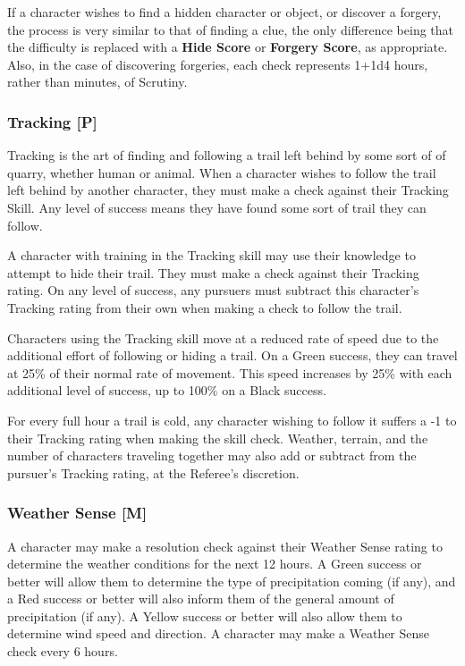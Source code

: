 \documentclass[oneside]{book}
\begin{document}
\begin{multicols}{2}
If a character wishes to find a hidden character or object, or discover a forgery, the process is very similar to that of finding a clue, the only difference being that the difficulty is replaced with a \textbf{Hide Score} or \textbf{Forgery Score}, as appropriate. Also, in the case of discovering forgeries, each check represents 1+1d4 hours, rather than minutes, of Scrutiny. 

\subsubsection{Tracking [P]}
Tracking is the art of finding and following a trail left behind by some sort of of quarry, whether human or animal. When a character wishes to follow the trail left behind by another character, they must make a check against their Tracking Skill. Any level of success means they have found some sort of trail they can follow.

A character with training in the Tracking skill may use their knowledge to attempt to hide their trail. They must make a check against their Tracking rating. On any level of success, any pursuers must subtract this character's Tracking rating from their own when making a check to follow the trail. 

Characters using the Tracking skill move at a reduced rate of speed due to the additional effort of following or hiding a trail. On a Green success, they can travel at 25\% of their normal rate of movement. This speed increases by 25\% with each additional level of success, up to 100\% on a Black success.

For every full hour a trail is cold, any character wishing to follow it suffers a -1 to their Tracking rating when making the skill check. Weather, terrain, and the number of characters traveling together may also add or subtract from the pursuer's Tracking rating, at the Referee's discretion.

\subsubsection{Weather Sense [M]}
A character may make a resolution check against their Weather Sense rating to determine the weather conditions for the next 12 hours. A Green success or better will allow them to determine the type of precipitation coming (if any), and a Red success or better will also inform them of the general amount of precipitation (if any). A Yellow success or better will also allow them to determine wind speed and direction. A character may make a Weather Sense check every 6 hours.


\end{multicols}
\end{document}
